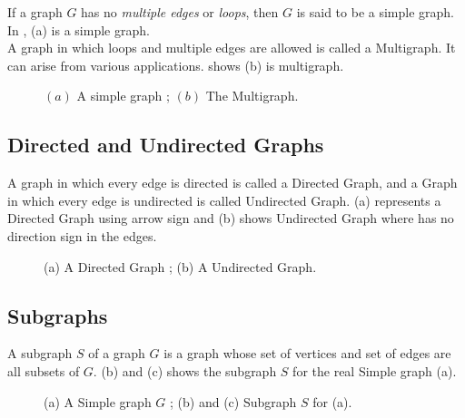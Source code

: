 If a graph $G$ has no \emph{multiple edges} or \emph{loops}, then $G$ is said to be a
simple graph. In , (a) is a simple graph.
\\
A graph in which loops and multiple edges are allowed is called a Multigraph. It can arise from various applications.  shows (b) is multigraph. 




\begin{figure}[!tb]
  \centering
\resizebox{100mm}{!}{}
\caption{$(a)$ A simple graph ; $(b)$  The Multigraph.}
\label{fig:simple_multi}
\end{figure}





\subsection{Directed and Undirected Graphs}

A graph in which every edge is directed is called a Directed Graph, and a Graph in which every edge is undirected is called Undirected Graph.  (a) represents a Directed Graph using arrow sign and (b) shows Undirected Graph where has no direction sign in the edges.


\begin{figure}[!tb]
  \centering
\resizebox{80mm}{!}{}
\caption{(a) A Directed Graph ; (b) A Undirected Graph.}
\label{fig:direct_undirect}
\end{figure}




\subsection{Subgraphs}
A subgraph $S$ of a graph $G$ is a graph whose set of vertices and set of edges are all subsets of $G$.  (b) and (c) shows the subgraph $S$ for the real Simple graph (a).


\begin{figure}[!tb]
  \centering
\resizebox{100mm}{!}{}
\caption{(a) A Simple graph $G$ ; (b) and (c) Subgraph $S$ for (a).}
\label{fig:subgraph}
\end{figure}







